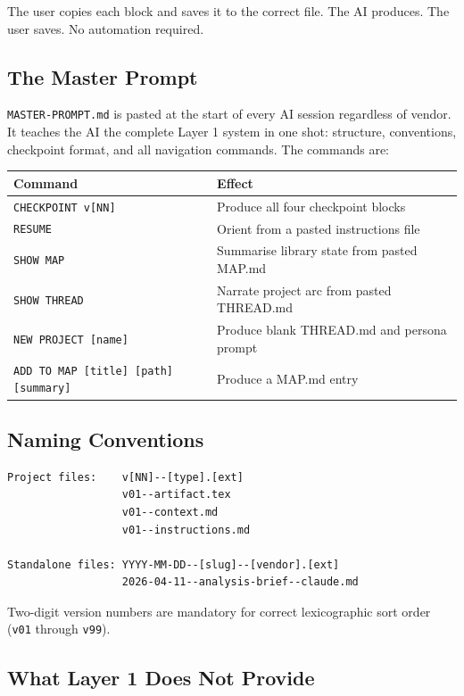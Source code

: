 \documentclass[12pt,letterpaper]{article}
\begin{document}
The user copies each block and saves it to the correct file.
The AI produces. The user saves. No automation required.

\subsection{The Master Prompt}

\texttt{MASTER-PROMPT.md} is pasted at the start of every AI session
regardless of vendor. It teaches the AI the complete Layer 1 system in
one shot: structure, conventions, checkpoint format, and all navigation
commands. The commands are:

\begin{center}
\begin{tabular}{@{}ll@{}}
\toprule
\textbf{Command} & \textbf{Effect} \\
\midrule
\texttt{CHECKPOINT v[NN]} & Produce all four checkpoint blocks \\
\texttt{RESUME} & Orient from a pasted instructions file \\
\texttt{SHOW MAP} & Summarise library state from pasted MAP.md \\
\texttt{SHOW THREAD} & Narrate project arc from pasted THREAD.md \\
\texttt{NEW PROJECT [name]} & Produce blank THREAD.md and persona prompt \\
\texttt{ADD TO MAP [title] [path] [summary]} & Produce a MAP.md entry \\
\bottomrule
\end{tabular}
\end{center}

\subsection{Naming Conventions}

\begin{lstlisting}
Project files:    v[NN]--[type].[ext]
                  v01--artifact.tex
                  v01--context.md
                  v01--instructions.md

Standalone files: YYYY-MM-DD--[slug]--[vendor].[ext]
                  2026-04-11--analysis-brief--claude.md
\end{lstlisting}

Two-digit version numbers are mandatory for correct lexicographic sort
order (\texttt{v01} through \texttt{v99}).

\subsection{What Layer 1 Does Not Provide}
\end{document}
